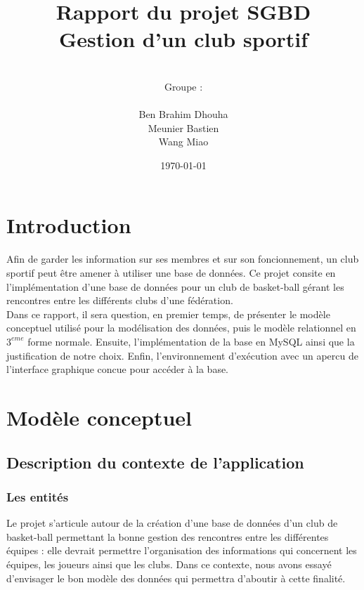 \documentclass{article}
\date{\vspace{3 cm} \today}
\author{\vspace{4 cm} \\ Groupe :\\ \\Ben Brahim Dhouha\\Meunier Bastien\\Wang Miao }
\title{Rapport du projet SGBD \\ Gestion d'un club sportif}
\begin{document}
\thispagestyle{empty}
\maketitle

\newpage


\section*{Introduction}


Afin de garder les information sur ses membres et sur son foncionnement, un club sportif peut être amener à utiliser une base de données. Ce projet consite en l'implémentation d'une base de données pour un club de basket-ball gérant les rencontres entre les différents clubs d'une fédération. \\

Dans ce rapport, il sera question, en premier temps, de présenter le modèle conceptuel utilisé pour la modélisation des données, puis le modèle relationnel en $3^{eme}$ forme normale. Ensuite, l'implémentation de la base en MySQL ainsi que la justification de notre choix. Enfin, l'environnement d'exécution avec un apercu de l'interface graphique concue pour accéder à la base. 


\newpage
\tableofcontents

\newpage
\section{Modèle conceptuel}

\subsection{Description du contexte de l'application}

\subsubsection*{Les entités}
Le projet s’articule autour de la création d’une base de données d’un club de basket-ball permettant la bonne gestion des rencontres entre les différentes équipes : elle devrait permettre l’organisation des informations qui concernent les équipes, les joueurs ainsi que les clubs.
Dans ce contexte, nous avons essayé d’envisager le bon modèle des données qui permettra d’aboutir à cette finalité.
\end{document}
